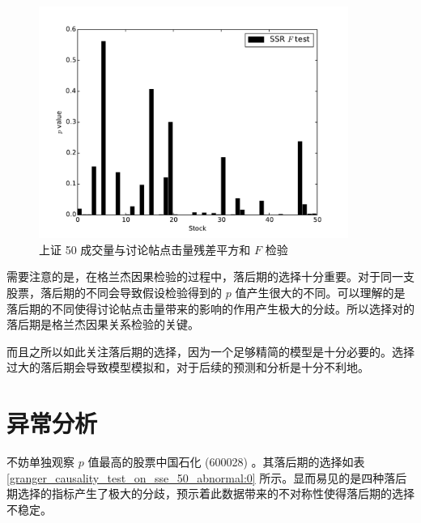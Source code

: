 \begin{figure}
  \centering
  \includegraphics[width=0.9\textwidth]{plots/granger_causality_test_on_sse_50_ssr_ftest.pdf}
  \caption{上证 50 成交量与讨论帖点击量残差平方和 $F$ 检验}
  \label{f_test:15}
\end{figure}

需要注意的是，在格兰杰因果检验的过程中，落后期的选择十分重要。对于同一支股票，落后期的不同会导致假设检验得到的 $p$ 值产生很大的不同。可以理解的是落后期的不同使得讨论帖点击量带来的影响的作用产生极大的分歧。所以选择对的落后期是格兰杰因果关系检验的关键。

而且之所以如此关注落后期的选择，因为一个足够精简的模型是十分必要的。选择过大的落后期会导致模型模拟和，对于后续的预测和分析是十分不利地。

\section{异常分析}

不妨单独观察 $p$ 值最高的股票中国石化 (600028) 。其落后期的选择如表 \ref{granger_causality_test_on_sse_50_abnormal:0} 所示。显而易见的是四种落后期选择的指标产生了极大的分歧，预示着此数据带来的不对称性使得落后期的选择不稳定。

